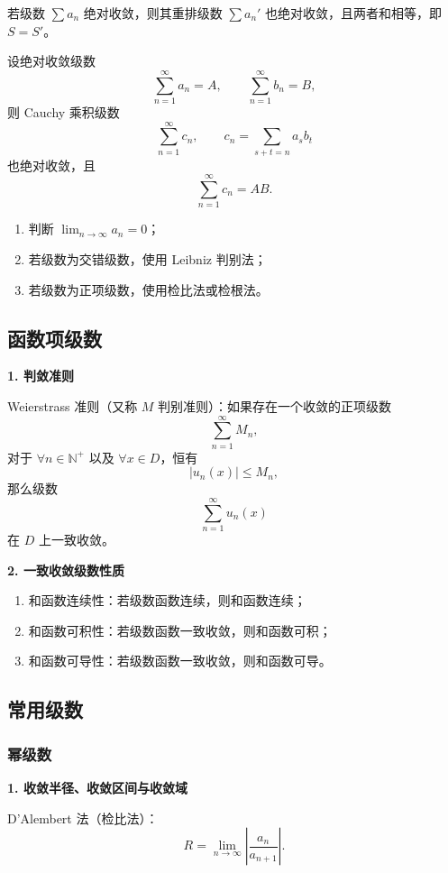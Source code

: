 \documentclass[UTF8,fontset=fandol,zihao=5]{ctexart}
\newcommand{\N}{\mathbb{N}}
\begin{document}
若级数 $\sum a_n$ 绝对收敛，则其重排级数 $\sum a_n'$ 也绝对收敛，且两者和相等，即 $S=S'$。

设绝对收敛级数
\[
\sum_{n=1}^{\infty}a_n=A,
\qquad
\sum_{n=1}^{\infty}b_n=B,
\]
则 Cauchy 乘积级数
\[
\sum_{n=1}^{\infty}c_n,
\qquad c_n=\sum_{s+t=n}a_sb_t
\]
也绝对收敛，且
\[
\sum_{n=1}^{\infty}c_n=AB.
\]

\begin{method}[数项级数判敛]
\begin{enumerate}
  \item 判断 $\displaystyle\lim_{n\to\infty}a_n=0$；
  \item 若级数为交错级数，使用 Leibniz 判别法；
  \item 若级数为正项级数，使用检比法或检根法。
\end{enumerate}
\end{method}

\subsection{函数项级数}

\textbf{1. 判敛准则}

Weierstrass 准则（又称 $M$ 判别准则）：如果存在一个收敛的正项级数
\[
\sum_{n=1}^{\infty}M_n,
\]
对于 $\forall n\in\N^+$ 以及 $\forall x\in D$，恒有
\[
|u_n(x)|\leq M_n,
\]
那么级数
\[
\sum_{n=1}^{\infty}u_n(x)
\]
在 $D$ 上一致收敛。

\textbf{2. 一致收敛级数性质}

\begin{enumerate}
  \item 和函数连续性：若级数函数连续，则和函数连续；
  \item 和函数可积性：若级数函数一致收敛，则和函数可积；
  \item 和函数可导性：若级数函数一致收敛，则和函数可导。
\end{enumerate}

\subsection{常用级数}

\subsubsection{幂级数}

\textbf{1. 收敛半径、收敛区间与收敛域}

D'Alembert 法（检比法）：
\[
R=\lim_{n\to\infty}\left|\frac{a_n}{a_{n+1}}\right|.
\]
\end{document}
